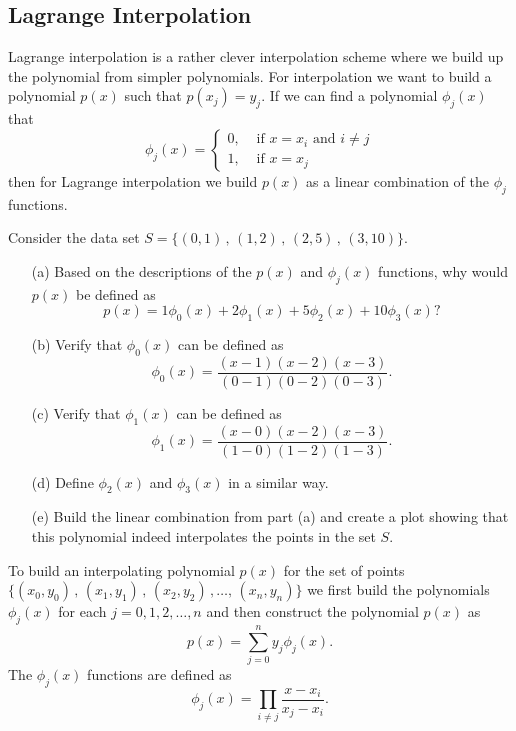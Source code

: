 \subsection{Lagrange Interpolation}
Lagrange interpolation is a rather clever interpolation scheme where we build up the
polynomial from simpler polynomials.  For interpolation we want to build a polynomial
$p(x)$ such that $p(x_j) = y_j$.  If we can find a polynomial $\phi_j(x)$ that 
\[ \phi_j(x) = \left\{ \begin{array}{ll} 0, & \text{ if } x = x_i \text{ and } i \ne j \\ 1, & \text{ if
    } x=x_j \end{array} \right. \]
then for Lagrange interpolation we build $p(x)$ as a linear combination of the $\phi_j$ functions.

\begin{problem}
    Consider the data set $S = \{(0,1) \, , \, (1,2) \, , \, (2,5) \, , \, (3,10) \}$.
    
    \begin{enumerate}
        \item[(a)] Based on the descriptions of the $p(x)$ and $\phi_j(x)$ functions, why would
            $p(x)$ be defined as
            \[ p(x) = 1 \phi_0(x) + 2 \phi_1(x) + 5 \phi_2(x) + 10 \phi_3(x)? \]
        \item[(b)] Verify that $\phi_0(x)$ can be defined as
            \[ \phi_0(x) = \frac{(x-1)(x-2)(x-3)}{(0-1)(0-2)(0-3)}. \]
        \item[(c)] Verify that $\phi_1(x)$ can be defined as
            \[ \phi_1(x) = \frac{(x-0)(x-2)(x-3)}{(1-0)(1-2)(1-3)}. \]
        \item[(d)] Define $\phi_2(x)$ and $\phi_3(x)$ in a similar way.
        \item[(e)] Build the linear combination from part (a) and create a plot showing that
            this polynomial indeed interpolates the points in the set $S$.
    \end{enumerate}
\end{problem}

\begin{technique}
    To build an interpolating polynomial $p(x)$ for the set of points
    $\{(x_0,y_0)\,,\,(x_1,y_1)\,,\,(x_2,y_2)\,,\ldots,\,(x_n,y_n)\}$ we first build the
    polynomials $\phi_j(x)$ for each $j = 0, 1, 2, \ldots, n$ and then construct the
    polynomial $p(x)$ as 
    \[ p(x) = \sum_{j=0}^n y_j \phi_j(x). \]
    The $\phi_j(x)$ functions are defined as
    \[ \phi_j(x) = \prod_{i \ne j} \frac{x-x_i}{x_j-x_i}. \]
\end{technique}


